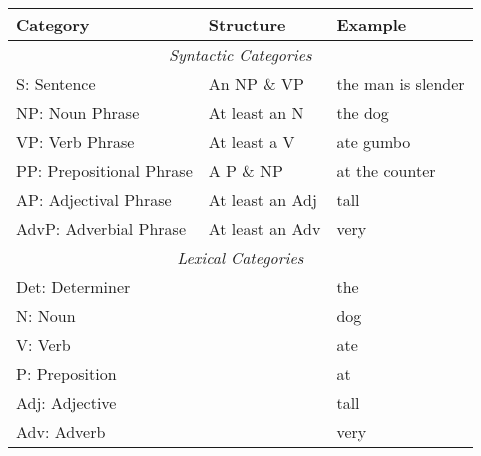 \begin{tabular}{l l l}
  \textbf{Category}         & \textbf{Structure}  & \textbf{Example} \\
  \hline
  \multicolumn{3}{c}{\emph{Syntactic Categories}} \\
  S: Sentence               & An NP \& VP         & the man is slender \\
  NP: Noun Phrase           & At least an N       & the dog \\
  VP: Verb Phrase           & At least a V        & ate gumbo \\
  PP: Prepositional Phrase  & A P \& NP           & at the counter \\
  AP: Adjectival Phrase     & At least an Adj     & tall \\
  AdvP: Adverbial Phrase    & At least an Adv     & very \\
  \multicolumn{3}{c}{\emph{Lexical Categories}} \\
  Det: Determiner           &                     & the \\
  N: Noun                   &                     & dog \\
  V: Verb                   &                     & ate \\
  P: Preposition            &                     & at \\
  Adj: Adjective            &                     & tall \\
  Adv: Adverb               &                     & very
\end{tabular}
